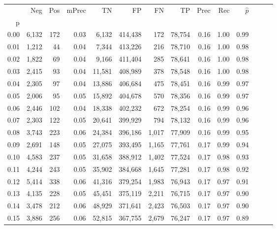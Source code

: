 \begin{tabular}{rrrrrrrrrrrrrr}
\toprule
{} &    Neg &    Pos & mPrec &       TN &       FP &      FN &      TP &  Prec &   Rec & $\hat{p}$ \\
p    &        &        &       &          &          &         &         &       &       &           \\
\midrule
0.00 &  6,132 &    172 &  0.03 &    6,132 &  414,438 &     172 &  78,754 &  0.16 &  1.00 &      0.99 \\
0.01 &  1,212 &     44 &  0.04 &    7,344 &  413,226 &     216 &  78,710 &  0.16 &  1.00 &      0.98 \\
0.02 &  1,822 &     69 &  0.04 &    9,166 &  411,404 &     285 &  78,641 &  0.16 &  1.00 &      0.98 \\
0.03 &  2,415 &     93 &  0.04 &   11,581 &  408,989 &     378 &  78,548 &  0.16 &  1.00 &      0.98 \\
0.04 &  2,305 &     97 &  0.04 &   13,886 &  406,684 &     475 &  78,451 &  0.16 &  0.99 &      0.97 \\
0.05 &  2,006 &     95 &  0.05 &   15,892 &  404,678 &     570 &  78,356 &  0.16 &  0.99 &      0.97 \\
0.06 &  2,446 &    102 &  0.04 &   18,338 &  402,232 &     672 &  78,254 &  0.16 &  0.99 &      0.96 \\
0.07 &  2,303 &    122 &  0.05 &   20,641 &  399,929 &     794 &  78,132 &  0.16 &  0.99 &      0.96 \\
0.08 &  3,743 &    223 &  0.06 &   24,384 &  396,186 &   1,017 &  77,909 &  0.16 &  0.99 &      0.95 \\
0.09 &  2,691 &    148 &  0.05 &   27,075 &  393,495 &   1,165 &  77,761 &  0.17 &  0.99 &      0.94 \\
0.10 &  4,583 &    237 &  0.05 &   31,658 &  388,912 &   1,402 &  77,524 &  0.17 &  0.98 &      0.93 \\
0.11 &  4,244 &    243 &  0.05 &   35,902 &  384,668 &   1,645 &  77,281 &  0.17 &  0.98 &      0.92 \\
0.12 &  5,414 &    338 &  0.06 &   41,316 &  379,254 &   1,983 &  76,943 &  0.17 &  0.97 &      0.91 \\
0.13 &  4,135 &    228 &  0.05 &   45,451 &  375,119 &   2,211 &  76,715 &  0.17 &  0.97 &      0.90 \\
0.14 &  3,478 &    212 &  0.06 &   48,929 &  371,641 &   2,423 &  76,503 &  0.17 &  0.97 &      0.90 \\
0.15 &  3,886 &    256 &  0.06 &   52,815 &  367,755 &   2,679 &  76,247 &  0.17 &  0.97 &      0.89 \\

\end{tabular}

